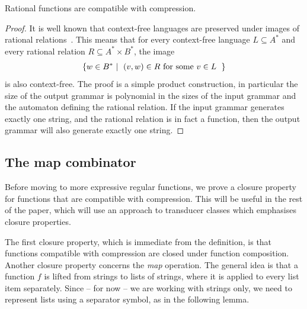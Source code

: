 \documentclass[a4paper,UKenglish,cleveref, autoref, thm-restate]{lipics-v2021}
\newcommand{\set}[1]{\{#1\}}
\newcommand{\setbuild}[2]{\set{#1 \ | 
\begin{tabular}{l}
	#2
\end{tabular}}}
\begin{document}
\begin{theorem}
    \label{thm:rational}
    Rational functions are compatible with compression.
\end{theorem}
\begin{proof}
     It is well known that context-free languages are preserved under images of rational relations~\cite[Chapter V]{berstel2013transductions}. This means that for every context-free language $L \subseteq A^*$ and every rational relation $R \subseteq A^* \times B^*$, the image 
\begin{align*}
\setbuild{ w \in B^* }{$(v,w) \in R$ for some $v \in L$}
\end{align*}
is also context-free. The proof is a simple product construction, in particular the size of the output grammar is polynomial in the sizes of the input grammar and the automaton defining the rational relation. If the input grammar generates exactly one string, and the rational relation is in fact a function, then the output grammar will also generate exactly one string. 
\end{proof}

\subsection{The map combinator}
\label{sec:map}
Before moving to more expressive regular functions, we prove a closure property for functions that are compatible with compression. This will be useful in the rest of the paper, which will use an approach to transducer classes which emphasises closure properties.

The first closure property, which is immediate from the definition, is that functions compatible with compression  are closed under function composition. Another closure property concerns the \emph{map} operation. The general idea is that a function $f$ is lifted from strings to lists of strings, where it is applied to every list item separately. Since -- for now -- we are working with strings only, we need to represent lists using a separator symbol, as in the following lemma.
\end{document}
